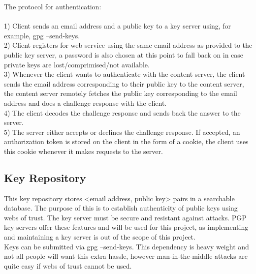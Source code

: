 \documentclass[11pt]{article}   %
\begin{document}
The protocol for authentication: \\
\\
1) Client sends an email address and a public key to a key server using, for example, gpg --send-keys. \\
2) Client registers for web service using the same email address as provided to the public key server, a password is also chosen at this point to fall back on in case private keys are lost/comprimised/not available. \\
3) Whenever the client wants to authenticate with the content server, the client sends the email address corresponding to their public key to the content server, the content server remotely fetches the public key corresponding to the email address and does a challenge response with the client. \\
4) The client decodes the challenge response and sends back the answer to the server. \\
5) The server either accepts or declines the challenge response. If accepted, an authorization token is stored on the client in the form of a cookie, the client uses this cookie whenever it makes requests to the server. \\

\subsection{Key Repository} \label{sec:sol_key_repository}
This key repository stores <email address, public key> pairs in a searchable database. The purpose of this is to establish authenticity of public keys using webs of trust. The key server must be secure and resistant against attacks. PGP key servers offer these features and will be used for this project, as implementing and maintaining a key server is out of the scope of this project. \\
Keys can be submitted via gpg --send-keys. This dependency is heavy weight and not all people will want this extra hassle, however man-in-the-middle attacks are quite easy if webs of trust cannot be used. \\
\end{document}
